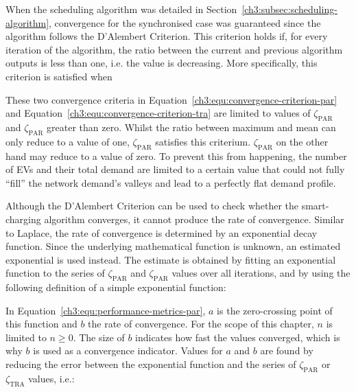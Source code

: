 When the scheduling algorithm was detailed in Section~\ref{ch3:subsec:scheduling-algorithm}, convergence for the synchronised case was guaranteed since the algorithm follows the D'Alembert Criterion.
This criterion holds if, for every iteration of the algorithm, the ratio between the current and previous algorithm outputs is less than one, i.e. the value is decreasing.
More specifically, this criterion is satisfied when



These two convergence criteria in Equation~\ref{ch3:equ:convergence-criterion-par} and Equation~\ref{ch3:equ:convergence-criterion-tra} are limited to values of $\zeta_\text{PAR}$ and $\zeta_\text{PAR}$ greater than zero.
Whilst the ratio between maximum and mean can only reduce to a value of one, $\zeta_\text{PAR}$ satisfies this criterium.
$\zeta_\text{PAR}$ on the other hand may reduce to a value of zero.
To prevent this from happening, the number of EVs and their total demand are limited to a certain value that could not fully ``fill'' the network demand's valleys and lead to a perfectly flat demand profile.

Although the D'Alembert Criterion can be used to check whether the smart-charging algorithm converges, it cannot produce the rate of convergence.
Similar to Laplace, the rate of convergence is determined by an exponential decay function.
Since the underlying mathematical function is unknown, an estimated exponential is used instead.
The estimate is obtained by fitting an exponential function to the series of $\zeta_\text{PAR}$ and $\zeta_\text{PAR}$ values over all iterations, and by using the following definition of a simple exponential function:



In Equation~\ref{ch3:equ:performance-metrics-par}, $a$ is the zero-crossing point of this function and $b$ the rate of convergence.
For the scope of this chapter, $n$ is limited to $n \geq 0$.
The size of $b$ indicates how fast the values converged, which is why $b$ is used as a convergence indicator.
Values for $a$ and $b$ are found by reducing the error between the exponential function and the series of $\zeta_\text{PAR}$ or $\zeta_\text{TRA}$ values, i.e.:



